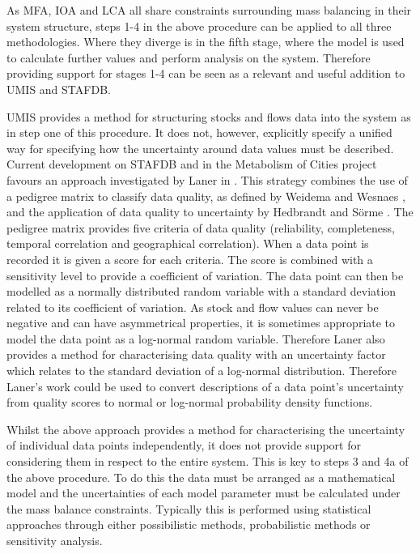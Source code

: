 \documentclass[ %
                    author={Tom Jager},
                supervisor={Dr. Daniel Schien},
                    degree={MEng},
                     title={A Bayesian Inference Engine for Calibrating Uncertainty over UMIS Structured MFA Systems},
                  subtitle={},
                      type={research},
                      year={2019} ]{dissertation}
\begin{document}
% 
As MFA, IOA and LCA all share constraints surrounding mass balancing in their system structure, steps 1-4 in the above procedure can be applied to all three methodologies. Where they diverge is in the fifth stage, where the model is used to calculate further values and perform analysis on the system. Therefore providing support for stages 1-4 can be seen as a relevant and useful addition to UMIS and STAFDB.

UMIS provides a method for structuring stocks and flows data into the system as in step one of this procedure. It does not, however, explicitly specify a unified way for specifying how the uncertainty around data values must be described. Current development on STAFDB and in the Metabolism of Cities project favours an approach investigated by Laner in \cite{laner2016novel}. This strategy combines the use of a pedigree matrix to classify data quality, as defined by Weidema and Wesnaes \cite{weidema1996data}, and the application of data quality to uncertainty by Hedbrandt and S\"orme \cite{hedbrant2001data}. The pedigree matrix provides five criteria of data quality (reliability, completeness, temporal correlation and geographical correlation). When a data point is recorded it is given a score for each criteria. The score is combined with a sensitivity level to provide a coefficient of variation. The data point can then be modelled as a normally distributed random variable with a standard deviation related to its coefficient of variation. As stock and flow values can never be negative and can have asymmetrical properties, it is sometimes appropriate to model the data point as a log-normal random variable. Therefore Laner also provides a method for characterising data quality with an uncertainty factor which relates to the standard deviation of a log-normal distribution. Therefore Laner's work could be used to convert descriptions of a data point's uncertainty from quality scores to normal or log-normal probability density functions.

Whilst the above approach provides a method for characterising the uncertainty of individual data points independently, it does not provide support for considering them in respect to the entire system. This is key to steps 3 and 4a of the above procedure. To do this the data must be arranged as a mathematical model and the uncertainties of each model parameter must be calculated under the mass balance constraints. Typically this is performed using statistical approaches through either possibilistic methods, probabilistic methods or sensitivity analysis. 
\end{document}
